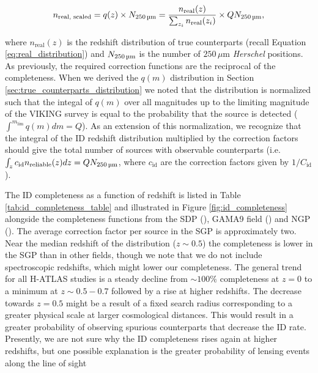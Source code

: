 \begin{equation}
    n_{\textrm{real, scaled}} = q(z)\times N_{\textrm{250\,\micron}} = \frac{n_{\textrm{real}}(z)}{\sum_{z_i}n_{\textrm{real}}(z_i)}\times QN_{\textrm{250\,\micron}},
    \label{eq:n_real_scaled}
\end{equation}

\noindent where $n_{\textrm{real}}(z)$ is the redshift distribution of true counterparts (recall Equation \ref{eq:real_distribution}) and $N_{\textrm{250\,\micron}}$ is the number of $250\,\mu$m \textit{Herschel} positions. As previously, the required correction functions are the reciprocal of the completeness. When we derived the $q(m)$ distribution in Section \ref{sec:true_counterparts_distribution} we noted that the distribution is normalized such that the integal of $q(m)$ over all magnitudes up to the limiting magnitude of the VIKING survey is equal to the probability that the source is detected ($\int^{m_\textrm{lim}} q(m) dm = Q$). As an extension of this normalization, we recognize that the integral of the ID redshift distribution multiplied by the correction factors should give the total number of sources with observable counterparts (i.e. $\int_z c_{\textrm{id}} n_{\textrm{reliable}}(z) dz = QN_{\textrm{250\,\micron}}$, where $c_{\textrm{id}}$ are the correction factors given by $1/C_{\textrm{id}}$).

The ID completeness as a function of redshift is listed in Table \ref{tab:id_completeness_table} and illustrated in Figure \ref{fig:id_completeness} alongside the completeness functions from the SDP (\citealt{Smith_2011}), GAMA9 field (\citealt{Fleuren_2012}) and NGP (\citealt{Bourne_2016}). The average correction factor per source in the SGP is approximately two. Near the median redshift of the distribution ($z \sim 0.5$) the completeness is lower in the SGP than in other fields, though we note that we do not include spectroscopic redshifts, which might lower our completeness. The general trend for all H-ATLAS studies is a steady decline from $\sim 100\%$ completeness at $z = 0$ to a minimum at $z \sim 0.5 - 0.7$ followed by a rise at higher redshifts. The decrease towards $z = 0.5$ might be a result of a fixed search radius corresponding to a greater physical scale at larger cosmological distances. This would result in a greater probability of observing spurious counterparts that decrease the ID rate. Presently, we are not sure why the ID completeness rises again at higher redshifts, but one possible explanation is the greater probability of lensing events along the line of sight 

